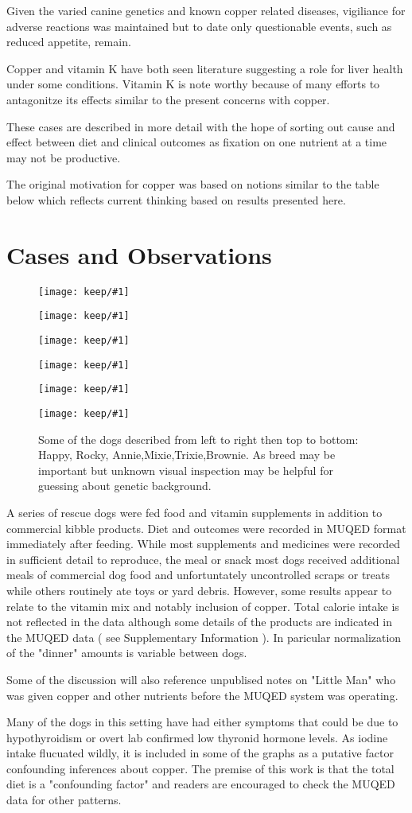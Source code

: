 \documentclass[aps,secnumarabic,balancelastpage,amsmath,amssymb,nofootinbib]{revtex4}
\newcommand{\mjmdogpic}[1]
{
\texttt{[image: keep/\#1]} 
}
\newcommand{\mjmdogsone}
{
\begin{figure}[H]
\mjmdogpic{happycu.jpeg}
\mjmdogpic{rockycu.jpeg}
\mjmdogpic{annie.jpeg}

\mjmdogpic{mixiepic.jpeg}
\mjmdogpic{trixiepic.jpeg}
\mjmdogpic{browniepic.jpeg}
\caption{Some of the dogs described from left to right then top to bottom: Happy, Rocky, Annie,Mixie,Trixie,Brownie.  As breed may be important but unknown visual inspection may be helpful for guessing about genetic background.  }
\label{fig:dogsone}
\end{figure}
} %
\begin{document}
Given the varied canine genetics and known copper related
diseases, vigiliance for adverse reactions was maintained
but to date only questionable events, such as reduced
appetite, remain. 

Copper and vitamin K have both seen literature suggesting
a role for liver health under some conditions. Vitamin K is
note worthy because of many efforts to antagonitze
its effects similar to the present  concerns with copper. 

 
These cases are described in more detail with the hope of
sorting out cause and effect between diet and clinical
outcomes as fixation on one nutrient at  a time may not
be productive. 


The original motivation for copper was based on notions
similar to the table below which reflects current
thinking based on results presented here. 



\section{Cases and Observations}

\mjmdogsone

A series of rescue dogs were fed food and vitamin supplements
in addition to commercial kibble products. Diet and outcomes
were recorded  in MUQED format
\cite{mmarchywka-MJM-2020-004-.012rg} immediately
after feeding.
While most supplements and medicines were recorded 
in sufficient detail to reproduce, the meal or snack   
most dogs received additional meals of commercial dog food
and unfortuntately uncontrolled scraps or treats while others
routinely ate toys or yard debris. However, some 
results appear to relate to the vitamin mix and notably
inclusion of  copper. Total calorie intake is not reflected in
the data although some details of the products are indicated
in the MUQED data ( see Supplementary Information ).   
In paricular normalization of the "dinner" amounts is variable
between dogs.

Some of the discussion will also reference unpublised notes
on "Little Man" who was given copper and other 
nutrients before the MUQED system was operating.

Many of the dogs in this setting have had either symptoms
that could be due to hypothyroidism or overt lab confirmed
low thyronid hormone levels. As iodine intake flucuated 
wildly, it is included in some of the graphs as 
a putative factor confounding inferences about copper. 
The premise of this work is that the total diet is
a "confounding factor" and readers are encouraged to check
the MUQED data for other patterns. 
\end{document}
